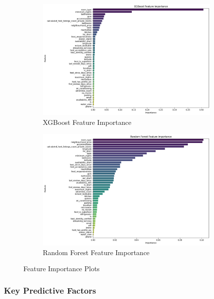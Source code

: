 \documentclass[12pt]{article}
\begin{document}
\begin{figure}[H]
\centering
\begin{subfigure}[b]{0.48\textwidth}
    \includegraphics[width=\textwidth]{images/xgb_importance.png}
    \caption{XGBoost Feature Importance}
    \label{fig:xgb_importance}
\end{subfigure}
\hfill
\begin{subfigure}[b]{0.48\textwidth}
    \includegraphics[width=\textwidth]{images/rf_importance.png}
    \caption{Random Forest Feature Importance}
    \label{fig:rf_importance}
\end{subfigure}
\caption{Feature Importance Plots}
\label{fig:feature_importance}
\end{figure}

\subsubsection{Key Predictive Factors}
\end{document}
